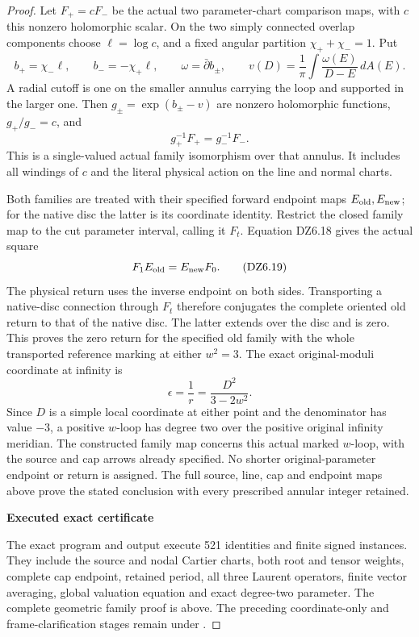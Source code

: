 \begin{proof}
Let \(F_+=cF_-\) be the actual two parameter-chart comparison
maps, with \(c\) this nonzero holomorphic scalar. On the two
simply connected overlap components choose \(\ell=\log c\),
and a fixed angular partition \(\chi_++\chi_-=1\). Put
\[
 b_+=\chi_-\ell,\qquad b_-=-\chi_+\ell,\qquad
 \omega=\bar\partial b_\pm,\qquad
 v(D)=\frac1\pi\int\frac{\omega(E)}{D-E}\,dA(E).
\]
A radial cutoff is one on the smaller annulus carrying the loop
and supported in the larger one. Then
\(g_\pm=\exp(b_\pm-v)\) are nonzero holomorphic functions,
\(g_+/g_-=c\), and
\[
                         g_+^{-1}F_+=g_-^{-1}F_- .
 \tag{DZ6.18}
\]
This is a single-valued actual family isomorphism over that
annulus. It includes all windings of \(c\) and the literal
physical action on the line and normal charts.

Both families are treated with their specified forward endpoint
maps \(E_{\rm old},E_{\rm new}\); for the native disc the latter
is its coordinate identity. Restrict the closed family map to
the cut parameter interval, calling it \(F_t\). Equation
DZ6.18 gives the actual square
\[
                 F_1E_{\rm old}=E_{\rm new}F_0 .
 \tag{DZ6.19}
\]
The physical return uses the inverse endpoint on both sides.
Transporting a native-disc connection through \(F_t\) therefore
conjugates the complete oriented old return to that of the
native disc. The latter extends over the disc and is zero.
This proves the zero return for the specified old family with
the whole transported reference marking at either \(w^2=3\).
The exact original-moduli coordinate at infinity is
\[
                 \epsilon=\frac1r
                    =\frac{D^2}{3-2w^2}.
 \tag{DZ6.20}
\]
Since \(D\) is a simple local coordinate at either point and
the denominator has value \(-3\), a positive \(w\)-loop has
degree two over the positive original infinity meridian.
The constructed family map concerns this actual marked
\(w\)-loop, with the source and cap arrows already specified.
No shorter original-parameter endpoint or return is assigned.
The full source, line, cap and endpoint maps above prove the stated conclusion with every prescribed annular integer retained.

\par

\medskip\noindent\textbf{Executed exact certificate}

\par\nobreak

The exact program  and output  execute 521 identities and finite signed instances. They include the source and nodal Cartier charts, both root and tensor weights, complete cap endpoint, retained period, all three Laurent operators, finite vector averaging, global valuation equation and exact degree-two parameter. The complete geometric family proof is above. The preceding coordinate-only and frame-clarification stages remain under .

\end{proof}
